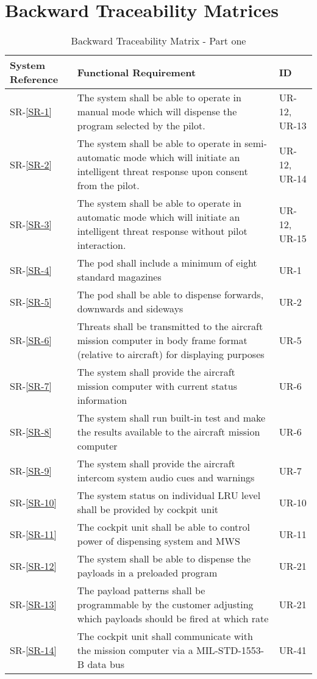 \documentclass[Main]{subfiles}
\begin{document}
\section{Backward Traceability Matrices}

\begin{table}[htbp]
	\centering
	\begin{tabular}{p{1.8cm} p{11cm} l} \hline
	System Reference & Functional Requirement & ID\\\hline
	SR-\ref{SR-1} &  The system shall be able to operate in manual mode which will dispense the program selected by the pilot. & UR-12, UR-13 \\
	SR-\ref{SR-2} & The system shall be able to operate in semi-automatic mode which will initiate an intelligent threat response upon consent from the pilot. & UR-12, UR-14 \\
	SR-\ref{SR-3} & The system shall be able to operate in automatic mode which will initiate an intelligent threat response without pilot interaction. & UR-12, UR-15 \\
	SR-\ref{SR-4} & The pod shall include a minimum of eight standard magazines & UR-1 \\
	SR-\ref{SR-5} & The pod shall be able to dispense forwards, downwards and sideways & UR-2 \\
	SR-\ref{SR-6} & Threats shall be transmitted to the aircraft mission computer in body frame format
	(relative to aircraft) for displaying purposes & UR-5 \\
	SR-\ref{SR-7} & The system shall provide the aircraft mission computer with current status information & UR-6 \\
	SR-\ref{SR-8} &  The system shall run built-in test and make the results available to the aircraft mission
	computer & UR-6 \\
	SR-\ref{SR-9} & The system shall provide the aircraft intercom system audio cues and warnings & UR-7 \\
	SR-\ref{SR-10} &  The system status on individual LRU level shall be provided by cockpit unit & UR-10 \\
	SR-\ref{SR-11} & The cockpit unit shall be able to control power of dispensing system and MWS & UR-11 \\
	SR-\ref{SR-12} & The system shall be able to dispense the payloads in a preloaded program & UR-21 \\
	SR-\ref{SR-13} & The payload patterns shall be programmable by the customer adjusting which payloads
	should be fired at which rate & UR-21 \\
	SR-\ref{SR-14} & The cockpit unit shall communicate with the mission computer via a MIL-STD-1553-B
	data bus & UR-41 \\\hline
	\end{tabular}
\caption{Backward Traceability Matrix - Part one}
\label{Tab:BackwardPartOne}
\end{table}
\end{document}
